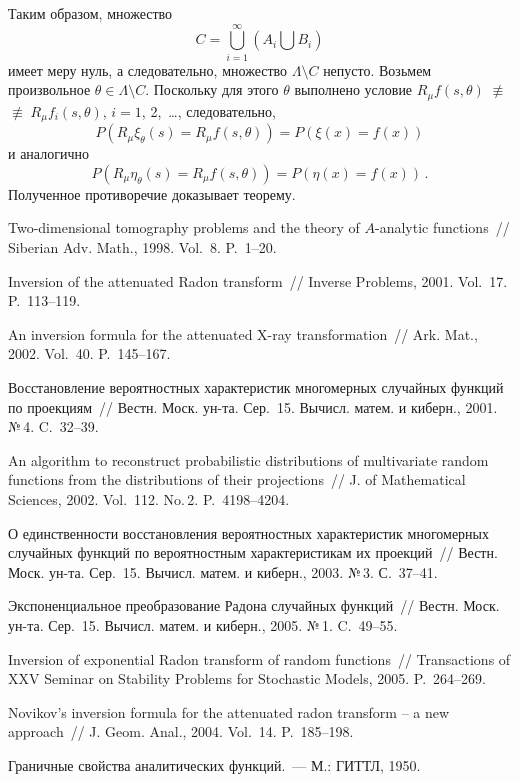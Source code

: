 \begin{multicols}{2}
Таким образом, множество
$$
C=\bigcup\limits_{i=1}^{\infty}\left(A_i\bigcup\limits B_i\right)
$$ 
имеет меру нуль, а следовательно, множество $\Lambda\setminus C$ непусто.
Возьмем произвольное $\theta\in\Lambda\setminus C$. Поскольку для
этого $\theta$ выполнено условие $R_{\mu}f(s,\theta)\;\not\equiv$\linebreak
$\not\equiv\;R_{\mu}f_i(s,\theta)$, $i=1$, 2,\ \ldots, следовательно,
$$
P(R_{\mu}\xi_{\theta}(s)=R_{\mu}f(s,\theta))=P(\xi(x)=f(x))
$$ 
и аналогично
$$
P(R_{\mu}\eta_{\theta}(s)=R_{\mu}f(s,\theta))=P(\eta(x)=f(x))\,.
$$
Полученное противоречие доказывает теорему.

{\small\frenchspacing
{%
\begin{thebibliography}{99}

Two-dimensional tomogra\-phy problems and the theory of $A$-analytic
functions~// Siberian Adv. Math., 1998. Vol.~8. P.~1--20.

Inversion of the attenuated Radon transform~//
Inverse Problems, 2001. Vol.~17. P.~113--119.

An inversion formula for the attenuated X-ray
transformation~// Ark. Mat., 2002. Vol.~40. P.~145--167.


Восстановление вероятностных
характеристик многомерных случайных функций по проекциям~// Вестн.
Моск. ун-та. Сер.~15. Вычисл. матем. и киберн., 2001. №\,4. C.~32--39.

An algorithm to reconstruct probabilistic
distributions of multivariate random functions from the
distributions of their projections~// J. of Mathematical
Sciences, 2002. Vol.~112. No.\,2. P.~4198--4204.

О единственности восстановления вероятностных
характеристик многомерных случайных функций по вероятностным
характеристикам их проекций~// Вестн. Моск. ун-та. Сер.~15. Вычисл.
матем. и киберн., 2003. №\,3. С.~37--41.

Экспоненциальное преобразование
Радона случайных функций~// Вестн. Моск. ун-та. Сер.~15. Вычисл.
матем. и киберн., 2005. №\,1. C.~49--55.

Inversion of exponential Radon transform of
random func\-tions~// Transactions of XXV Seminar on Stability
Problems for Stochastic Models, 2005. P.~264--269.

Novikov's inversion formula for
the attenuated radon transform -- a new approach~// J. Geom. Anal., 2004.
Vol.~14. P.~185--198.

 \label{end\stat}

Граничные свойства аналитических функций.~--- М.: ГИТТЛ, 1950.
\end{thebibliography}
}
}
\end{multicols}  